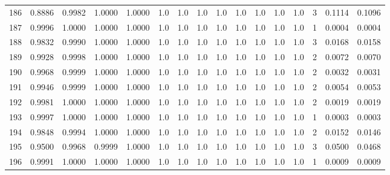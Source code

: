 \begin{tabular}{lrrrrrrrrrrrrrrr}
186 &      0.8886 &  0.9982 &  1.0000 &  1.0000 &     1.0 &     1.0 &     1.0 &     1.0 &     1.0 &     1.0 &      1.0 &        1.0 &      3 &                    0.1114 &                     0.1096 \\
187 &      0.9996 &  1.0000 &  1.0000 &  1.0000 &     1.0 &     1.0 &     1.0 &     1.0 &     1.0 &     1.0 &      1.0 &        1.0 &      1 &                    0.0004 &                     0.0004 \\
188 &      0.9832 &  0.9990 &  1.0000 &  1.0000 &     1.0 &     1.0 &     1.0 &     1.0 &     1.0 &     1.0 &      1.0 &        1.0 &      3 &                    0.0168 &                     0.0158 \\
189 &      0.9928 &  0.9998 &  1.0000 &  1.0000 &     1.0 &     1.0 &     1.0 &     1.0 &     1.0 &     1.0 &      1.0 &        1.0 &      2 &                    0.0072 &                     0.0070 \\
190 &      0.9968 &  0.9999 &  1.0000 &  1.0000 &     1.0 &     1.0 &     1.0 &     1.0 &     1.0 &     1.0 &      1.0 &        1.0 &      2 &                    0.0032 &                     0.0031 \\
191 &      0.9946 &  0.9999 &  1.0000 &  1.0000 &     1.0 &     1.0 &     1.0 &     1.0 &     1.0 &     1.0 &      1.0 &        1.0 &      2 &                    0.0054 &                     0.0053 \\
192 &      0.9981 &  1.0000 &  1.0000 &  1.0000 &     1.0 &     1.0 &     1.0 &     1.0 &     1.0 &     1.0 &      1.0 &        1.0 &      2 &                    0.0019 &                     0.0019 \\
193 &      0.9997 &  1.0000 &  1.0000 &  1.0000 &     1.0 &     1.0 &     1.0 &     1.0 &     1.0 &     1.0 &      1.0 &        1.0 &      1 &                    0.0003 &                     0.0003 \\
194 &      0.9848 &  0.9994 &  1.0000 &  1.0000 &     1.0 &     1.0 &     1.0 &     1.0 &     1.0 &     1.0 &      1.0 &        1.0 &      2 &                    0.0152 &                     0.0146 \\
195 &      0.9500 &  0.9968 &  0.9999 &  1.0000 &     1.0 &     1.0 &     1.0 &     1.0 &     1.0 &     1.0 &      1.0 &        1.0 &      3 &                    0.0500 &                     0.0468 \\
196 &      0.9991 &  1.0000 &  1.0000 &  1.0000 &     1.0 &     1.0 &     1.0 &     1.0 &     1.0 &     1.0 &      1.0 &        1.0 &      1 &                    0.0009 &                     0.0009 \\

\end{tabular}
